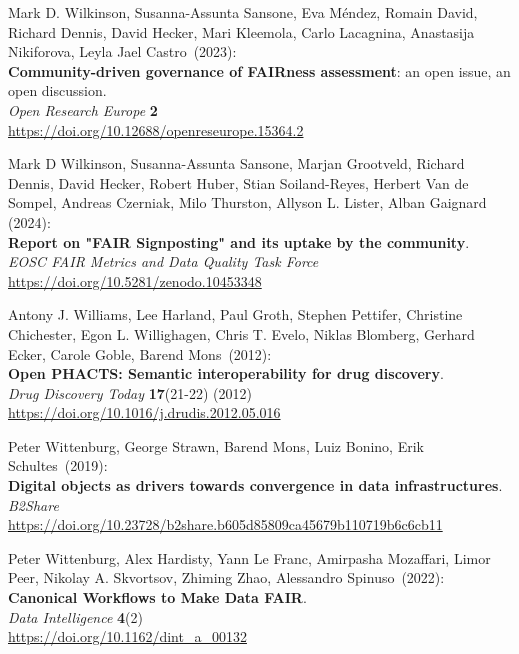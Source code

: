 \begin{thebibliography}{9}
Mark D. Wilkinson, Susanna-Assunta Sansone, Eva Méndez, Romain David, Richard Dennis, David Hecker, Mari Kleemola, Carlo Lacagnina, Anastasija Nikiforova, Leyla Jael Castro~(2023): \\
\textbf{Community-driven governance of FAIRness assessment}: an open issue, an open discussion.\\
\emph{Open Research Europe} \textbf{2}\\
\url{https://doi.org/10.12688/openreseurope.15364.2}

Mark D Wilkinson, Susanna-Assunta Sansone, Marjan Grootveld, Richard Dennis, David Hecker, Robert Huber, Stian Soiland-Reyes, Herbert Van de Sompel, Andreas Czerniak, Milo Thurston, Allyson L. Lister, Alban Gaignard (2024):\\ 
\textbf{Report on "FAIR Signposting" and its uptake by the community}.\\
\emph{EOSC FAIR Metrics and Data Quality Task Force} \\
\url{https://doi.org/10.5281/zenodo.10453348}

Antony J. Williams, Lee Harland, Paul Groth, Stephen Pettifer, Christine
Chichester, Egon L. Willighagen, Chris T. Evelo, Niklas Blomberg,
Gerhard Ecker, Carole Goble, Barend Mons~(2012): \\
\textbf{Open {PHACTS}: Semantic interoperability for drug discovery}.\\
\emph{Drug Discovery Today} \textbf{17}(21-22) (2012) \\
\url{https://doi.org/10.1016/j.drudis.2012.05.016}

Peter Wittenburg, George Strawn, Barend Mons, Luiz Bonino, Erik
Schultes~(2019): \\
\textbf{Digital objects as drivers towards convergence in data
infrastructures}. \\
\emph{B2Share}\\
\url{https://doi.org/10.23728/b2share.b605d85809ca45679b110719b6c6cb11}

Peter Wittenburg, Alex Hardisty, Yann Le Franc, Amirpasha Mozaffari, Limor Peer, Nikolay A. Skvortsov, Zhiming Zhao, Alessandro Spinuso~(2022): \\
\textbf{Canonical Workflows to Make Data FAIR}.\\
\emph{Data Intelligence} \textbf{4}(2)\\
\url{https://doi.org/10.1162/dint_a_00132}


\end{thebibliography}
